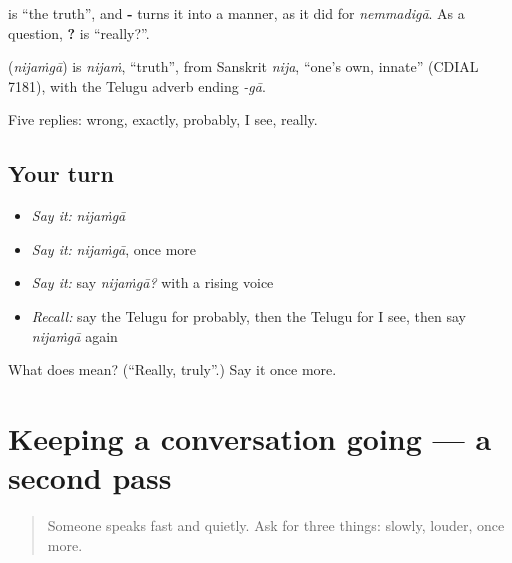 \textbf{} is \textquotedblleft{}the truth\textquotedblright{}, and \textbf{-} turns it into a manner, as it did for \emph{nemmadigā}. As a question, \textbf{?} is \textquotedblleft{}really?\textquotedblright{}.

\begin{cousinweb}
\textbf{} (\emph{nijaṁgā}) is \emph{nijaṁ}, \textquotedblleft{}truth\textquotedblright{}, from Sanskrit \emph{nija}, \textquotedblleft{}one's own, innate\textquotedblright{} (CDIAL 7181), with the Telugu adverb ending \emph{-gā}.
\end{cousinweb}

\begin{grammarlens}[title={What you've built}]
Five replies: wrong, exactly, probably, I see, really.
\end{grammarlens}

\subsection*{Your turn}
\begin{itemize}
\raggedright
  \item \emph{Say it:} \emph{nijaṁgā}
  \item \emph{Say it:} \emph{nijaṁgā}, once more
  \item \emph{Say it:} say \emph{nijaṁgā?} with a rising voice
  \item \emph{Recall:} say the Telugu for probably, then the Telugu for I see, then say \emph{nijaṁgā} again
\end{itemize}

\begin{tcolorbox}[breakable,colback=teal!4,colframe=teal!35!black,title={Before you move on}]
What does  mean? (\textquotedblleft{}Really, truly\textquotedblright{}.) Say it once more.
\end{tcolorbox}
\section[(dialogue)]{Keeping a conversation going — a second pass}

\label{lesson:TE-R87-second-pass-replies}



\begin{quote}
Someone speaks fast and quietly. Ask for three things: slowly, louder, once more.
\end{quote}

